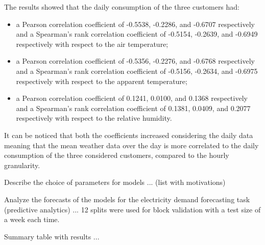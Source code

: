The results showed that the daily consumption of the three customers had:
\begin{itemize}
  \item a Pearson correlation coefficient of -0.5538, -0.2286, and -0.6707 respectively and a Spearman's rank correlation coefficient of -0.5154, -0.2639, and -0.6949 respectively with respect to the air temperature;
  \item a Pearson correlation coefficient of -0.5356, -0.2276, and -0.6768 respectively and a Spearman's rank correlation coefficient of -0.5156, -0.2634, and -0.6975 respectively with respect to the apparent temperature;
  \item a Pearson correlation coefficient of 0.1241, 0.0100, and 0.1368 respectively and a Spearman's rank correlation coefficient of 0.1381, 0.0409, and 0.2077 respectively with respect to the relative humidity.
\end{itemize}
It can be noticed that both the coefficients increased considering the daily data meaning that the mean weather data over the day is more correlated to the daily consumption of the three considered customers, compared to the hourly granularity.


Describe the choice of parameters for models ... (list with motivations)

Analyze the forecasts of the models for the electricity demand forecasting task (predictive analytics) ...
12 splits were used for block validation with a test size of a week each time.

Summary table with results ...
